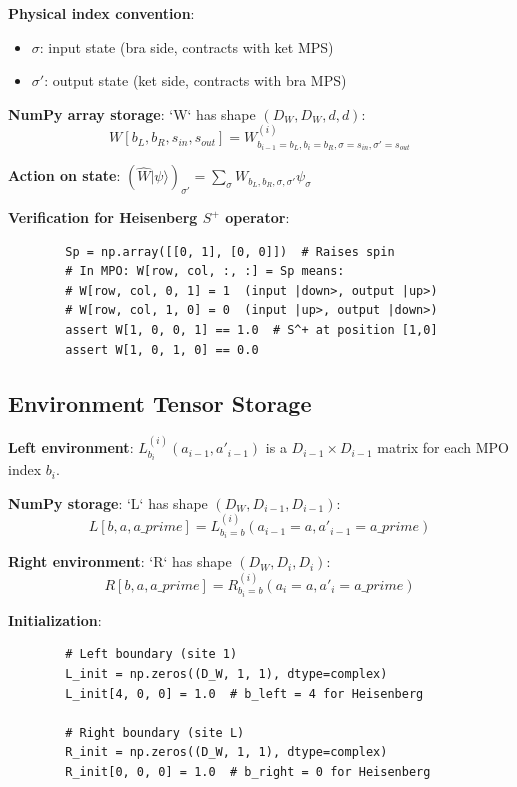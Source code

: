 \documentclass[aps,prb,onecolumn,scriptaddress]{revtex4-2}
\newcommand{\ket}[1]{|#1\rangle}
\begin{document}
	\textbf{Physical index convention}:
	\begin{itemize}
		\item $\sigma$: input state (bra side, contracts with ket MPS)
		\item $\sigma'$: output state (ket side, contracts with bra MPS)
	\end{itemize}
	
	\textbf{NumPy array storage}: `W` has shape $(D_W, D_W, d, d)$:
	\begin{equation}
		\boxed{W[b_L, b_R, s_{in}, s_{out}] = W^{(i)}_{b_{i-1}=b_L, b_i=b_R, \sigma=s_{in}, \sigma'=s_{out}}}
	\end{equation}
	
	\textbf{Action on state}: $(\hat{W}\ket{\psi})_{\sigma'} = \sum_{\sigma} W_{b_L,b_R,\sigma,\sigma'} \psi_{\sigma}$
	
	\textbf{Verification for Heisenberg $S^+$ operator}:
	\begin{verbatim}
		Sp = np.array([[0, 1], [0, 0]])  # Raises spin
		# In MPO: W[row, col, :, :] = Sp means:
		# W[row, col, 0, 1] = 1  (input |down>, output |up>)
		# W[row, col, 1, 0] = 0  (input |up>, output |down>)
		assert W[1, 0, 0, 1] == 1.0  # S^+ at position [1,0]
		assert W[1, 0, 1, 0] == 0.0
	\end{verbatim}
	
	\subsection{Environment Tensor Storage}
	
	\textbf{Left environment}: $L^{(i)}_{b_i}(a_{i-1}, a'_{i-1})$ is a $D_{i-1} \times D_{i-1}$ matrix for each MPO index $b_i$.
	
	\textbf{NumPy storage}: `L` has shape $(D_W, D_{i-1}, D_{i-1})$:
	\begin{equation}
		\boxed{L[b, a, a\_prime] = L^{(i)}_{b_i=b}(a_{i-1}=a, a'_{i-1}=a\_prime)}
	\end{equation}
	
	\textbf{Right environment}: `R` has shape $(D_W, D_i, D_i)$:
	\begin{equation}
		\boxed{R[b, a, a\_prime] = R^{(i)}_{b_i=b}(a_i=a, a'_i=a\_prime)}
	\end{equation}
	
	\textbf{Initialization}:
	\begin{verbatim}
		# Left boundary (site 1)
		L_init = np.zeros((D_W, 1, 1), dtype=complex)
		L_init[4, 0, 0] = 1.0  # b_left = 4 for Heisenberg
		
		# Right boundary (site L)
		R_init = np.zeros((D_W, 1, 1), dtype=complex)
		R_init[0, 0, 0] = 1.0  # b_right = 0 for Heisenberg
	\end{verbatim}
	
\end{document}
